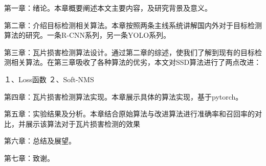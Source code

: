 第一章：绪论。本章概要阐述本文主要内容，及研究背景及意义。

第二章：介绍目标检测相关算法。本章按照两条主线系统讲解国内外对于目标检测算法的研究。一条R-CNN系列，另一条YOLO系列。

第三章：瓦片损害检测算法设计。通过第二章的综述，使我们了解到现有的目标检测相关算法。在第三章吸收了各种算法的优劣，本文对SSD算法进行了两点改进：

１、Loss函数
２、Soft-NMS

第四章：瓦片损害检测算法实现。本章展示具体的算法实现，基于pytorch。

第五章：实验结果及分析。本章结合原始算法与改进算法进行准确率和召回率的对比，并展示该算法对于瓦片损害检测的效果　

第六章：总结及展望。

第七章：致谢。